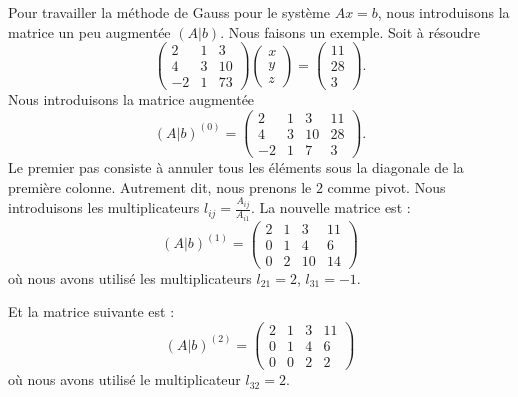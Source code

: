 \begin{example}
	Pour travailler la méthode de Gauss pour le système \( Ax=b\), nous introduisons la matrice un peu augmentée \( (A|b)\). Nous faisons un exemple. Soit à résoudre
	\begin{equation}
		\begin{pmatrix}
			2  & 1 & 3    \\
			4  & 3 & 10   \\
			-2 & 1 & 7  3
		\end{pmatrix}
		\begin{pmatrix}
			x \\
			y \\
			z
		\end{pmatrix}=\begin{pmatrix}
			11 \\
			28 \\
			3
		\end{pmatrix}.
	\end{equation}
	Nous introduisons la matrice augmentée
	\begin{equation}
		(A|b)^{(0)}=\begin{pmatrix}
			2  & 1 & 3  & 11 \\
			4  & 3 & 10 & 28 \\
			-2 & 1 & 7  & 3
		\end{pmatrix}.
	\end{equation}
	Le premier pas consiste à annuler tous les éléments sous la diagonale de la première colonne. Autrement dit, nous prenons le \( 2\) comme pivot. Nous introduisons les multiplicateurs \( l_{ij}= \frac{ A_{ij} }{ A_{i1} }\). La nouvelle matrice est :
	\begin{equation}
		(A|b)^{(1)}=\begin{pmatrix}
			2 & 1 & 3  & 11 \\
			0 & 1 & 4  & 6  \\
			0 & 2 & 10 & 14
		\end{pmatrix}
	\end{equation}
	où nous avons utilisé les multiplicateurs \( l_{21}=2\), \( l_{31}=-1\).

	Et la matrice suivante est :
	\begin{equation}
		(A|b)^{(2)}=\begin{pmatrix}
			2 & 1 & 3 & 11 \\
			0 & 1 & 4 & 6  \\
			0 & 0 & 2 & 2
		\end{pmatrix}
	\end{equation}
	où nous avons utilisé le multiplicateur \( l_{32}=2\).


\end{example}
